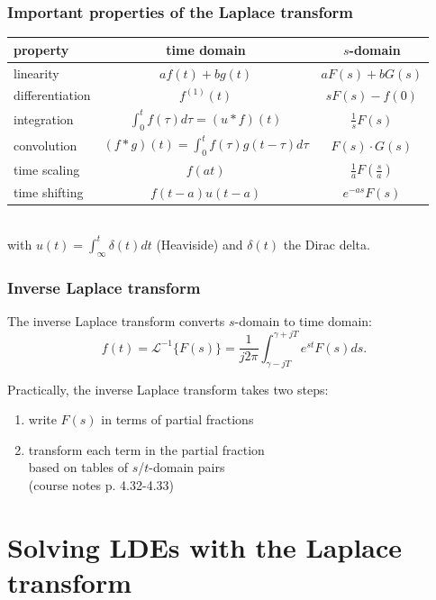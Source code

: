 \begin{frame}
\frametitle{Important properties of the Laplace transform}
\centering
\begin{tabular}{lcc}
\textbf{property}	& \textbf{time domain}	& \textbf{$s$-domain} \\
\midrule
linearity	& $af(t)+bg(t)$ & $aF(s) + bG(s)$ \\
\vspace{4ex}
differentiation	& $f^{(1)}(t)$	& $s F(s) - f(0)$ \\
\vspace{4ex}
integration	& $\int_0^t f(\tau)d\tau = (u*f)(t)$	&	$\frac{1}{s}F(s)$ \\
\vspace{4ex}
convolution	& $(f * g)(t)=\int_0^t f(\tau)g(t-\tau)d\tau$	& $F(s)\cdot G(s)$ \\
\vspace{4ex}
time scaling	& $f(at)$	& $\frac{1}{a}F(\frac{s}{a})$ \\
\vspace{4ex}
time shifting	& $f(t-a)u(t-a)$	& $e^{-as} F(s)$ \\
\end{tabular} \\
with $u(t)=\int_\infty^t \delta(t)dt$ (Heaviside) and $\delta(t)$ the Dirac delta.
\end{frame}

\begin{frame}
\frametitle{Inverse Laplace transform}
\begin{definition}
The inverse Laplace transform converts $s$-domain to time domain:
\begin{equation*}
f(t) = \mathcal{L}^{-1}\{F(s)\} = \frac{1}{j2\pi}\int_{\gamma-jT}^{\gamma+jT} e^{st} F(s) ds.
\end{equation*}
\end{definition}
\vspace{1em}
Practically, the inverse Laplace transform takes two steps:
\begin{enumerate}
\item write $F(s)$ in terms of partial fractions
\item transform each term in the partial fraction \\ based on tables of $s$/$t$-domain pairs \\ (course notes p. 4.32-4.33)
\end{enumerate}
\end{frame}

\section{Solving LDEs with the Laplace transform}

